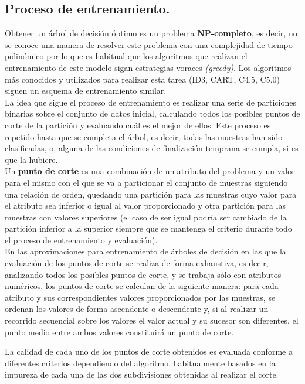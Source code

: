 \subsection{Proceso de entrenamiento.} 

Obtener un árbol de decisión óptimo es un problema \textbf{NP-completo}, es decir, no se conoce una manera de resolver este problema con una complejidad de tiempo polinómico por lo que es habitual que los algoritmos que realizan el entrenamiento de este modelo sigan estrategias voraces \textit{(greedy)}. Los algoritmos más conocidos y utilizados para realizar esta tarea (ID3, CART, C4.5, C5.0) siguen un esquema de entrenamiento similar. \\

La idea que sigue el proceso de entrenamiento es realizar una serie de particiones binarias sobre el conjunto de datos inicial, calculando todos los posibles puntos de corte de la partición y evaluando cuál es el mejor de ellos. Este proceso es repetido hasta que se completa el árbol, es decir, todas las muestras han sido clasificadas, o, alguna de las condiciones de finalización temprana se cumpla, si es que la hubiere.\\

Un \textbf{punto de corte} es una combinación de un atributo del problema y un valor para el mismo con el que se va a particionar el conjunto de muestras siguiendo una relación de orden, quedando una partición para las muestras cuyo valor para el atributo sea inferior o igual al valor proporcionado y otra partición para las muestras con valores superiores (el caso de ser igual podría ser cambiado de la partición inferior a la superior siempre que se mantenga el criterio durante todo el proceso de entrenamiento y evaluación).\\

En las aproximaciones para entrenamiento de árboles de decisión en las que la evaluación de los puntos de corte se realiza de forma exhaustiva, es decir, analizando todos los posibles puntos de corte, y se trabaja sólo con atributos numéricos, los puntos de corte se calculan de la siguiente manera: para cada atributo y sus correspondientes valores proporcionados por las muestras, se ordenan los valores de forma ascendente o descendente y, si al realizar un recorrido secuencial sobre los valores el valor actual y su sucesor son diferentes, el punto medio entre ambos valores constituirá un punto de corte.

La calidad de cada uno de los puntos de corte obtenidos es evaluada conforme a diferentes criterios dependiendo del algoritmo, habitualmente basados en la impureza de cada una de las dos subdivisiones obtenidas al realizar el corte. \\

